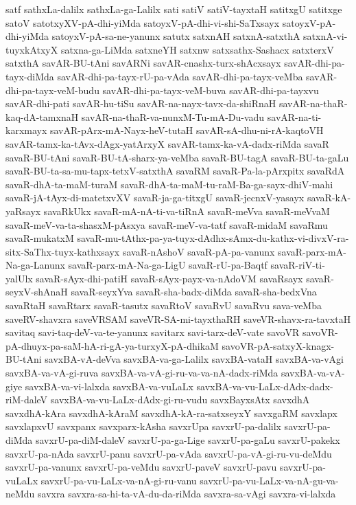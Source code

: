 {satf
sathxLa-dalilx
sathxLa-ga-Lalilx
sati
satiV
satiV-tayxtaH
satitxgU
satitxge
satoV
satotxyXV-pA-dhi-yiMda
satoyxV-pA-dhi-vi-shi-SaTxsayx
satoyxV-pA-dhi-yiMda
satoyxV-pA-sa-ne-yanunx
satutx
satxnAH
satxnA-satxthA
satxnA-vi-tuyxkAtxyX
satxna-ga-LiMda
satxneYH
satxnw
satxsathx-Sashacx
satxterxV
satxthA
savAR-BU-tAni
savARNi
savAR-cnashx-turx-shAcxsayx
savAR-dhi-pa-tayx-diMda
savAR-dhi-pa-tayx-rU-pa-vAda
savAR-dhi-pa-tayx-veMba
savAR-dhi-pa-tayx-veM-budu
savAR-dhi-pa-tayx-veM-buva
savAR-dhi-pa-tayxvu
savAR-dhi-pati
savAR-hu-tiSu
savAR-na-nayx-tavx-da-shiRnaH
savAR-na-thaR-kaq-dA-tamxnaH
savAR-na-thaR-va-nunxM-Tu-mA-Du-vadu
savAR-na-ti-karxmayx
savAR-pArx-mA-Nayx-heV-tutaH
savAR-sA-dhu-ni-rA-kaqtoVH
savAR-tamx-ka-tAvx-dAgx-yatArxyX
savAR-tamx-ka-vA-dadx-riMda
savaR
savaR-BU-tAni
savaR-BU-tA-sharx-ya-veMba
savaR-BU-tagA
savaR-BU-ta-gaLu
savaR-BU-ta-sa-mu-tapx-tetxV-satxthA
savaRM
savaR-Pa-la-pArxpitx
savaRdA
savaR-dhA-ta-maM-turaM
savaR-dhA-ta-maM-tu-raM-Ba-ga-sayx-dhiV-mahi
savaR-jA-tAyx-di-matetxvXV
savaR-ja-ga-titxgU
savaR-jecnxV-yasayx
savaR-kA-yaRsayx
savaRkUkx
savaR-mA-nA-ti-va-tiRnA
savaR-meVva
savaR-meVvaM
savaR-meV-va-ta-shasxM-pAsxya
savaR-meV-va-tatf
savaR-midaM
savaRmu
savaR-mukatxM
savaR-mu-tAthx-pa-ya-tuyx-dAdhx-sAmx-du-kathx-vi-divxV-ra-sitx-SaThx-tuyx-kathxsayx
savaR-nAshoV
savaR-pA-pa-vanunx
savaR-parx-mA-Na-ga-Lanunx
savaR-parx-mA-Na-ga-LigU
savaR-rU-pa-Baqtf
savaR-riV-ti-yalUlx
savaR-sAyx-dhi-patiH
savaR-sAyx-payx-va-nAdoVM
savaRsayx
savaR-seyxV-shAnaH
savaR-seyxYva
savaR-sha-badx-diMda
savaR-sha-bedxVna
savaRtaH
savaRtarx
savaR-tasutx
savaRtoV
savaRvU
savaRvu
sava-veMba
saveRV-shavxra
saveVRSAM
saveVR-SA-mi-tayxthaRH
saveVR-shavx-ra-tavxtaH
savitaq
savi-taq-deV-va-te-yanunx
savitarx
savi-tarx-deV-vate
savoVR
savoVR-pA-dhuyx-pa-saM-hA-ri-gA-ya-turxyX-pA-dhikaM
savoVR-pA-satxyX-knagx-BU-tAni
savxBA-vA-deVva
savxBA-va-ga-Lalilx
savxBA-vataH
savxBA-va-vAgi
savxBA-va-vA-gi-ruva
savxBA-va-vA-gi-ru-va-va-nA-dadx-riMda
savxBA-va-vA-giye
savxBA-va-vi-lalxda
savxBA-va-vuLaLx
savxBA-va-vu-LaLx-dAdx-dadx-riM-daleV
savxBA-va-vu-LaLx-dAdx-gi-ru-vudu
savxBayxsAtx
savxdhA
savxdhA-kAra
savxdhA-kAraM
savxdhA-kA-ra-satxseyxY
savxgaRM
savxlapx
savxlapxvU
savxpanx
savxparx-kAsha
savxrUpa
savxrU-pa-dalilx
savxrU-pa-diMda
savxrU-pa-diM-daleV
savxrU-pa-ga-Lige
savxrU-pa-gaLu
savxrU-pakekx
savxrU-pa-nAda
savxrU-panu
savxrU-pa-vAda
savxrU-pa-vA-gi-ru-vu-deMdu
savxrU-pa-vanunx
savxrU-pa-veMdu
savxrU-paveV
savxrU-pavu
savxrU-pa-vuLaLx
savxrU-pa-vu-LaLx-va-nA-gi-ru-vanu
savxrU-pa-vu-LaLx-va-nA-gu-va-neMdu
savxra
savxra-sa-hi-ta-vA-du-da-riMda
savxra-sa-vAgi
savxra-vi-lalxda
}
